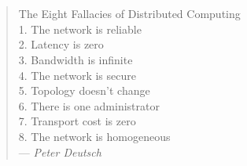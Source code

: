 \chapter*{}
\begin{quote}
The Eight Fallacies of Distributed Computing\\
 1. The network is reliable\\
 2. Latency is zero\\
 3. Bandwidth is infinite\\
 4. The network is secure\\
 5. Topology doesn't change\\
 6. There is one administrator\\
 7. Transport cost is zero\\
 8. The network is homogeneous\\
--- \emph{Peter Deutsch}
\end{quote}
